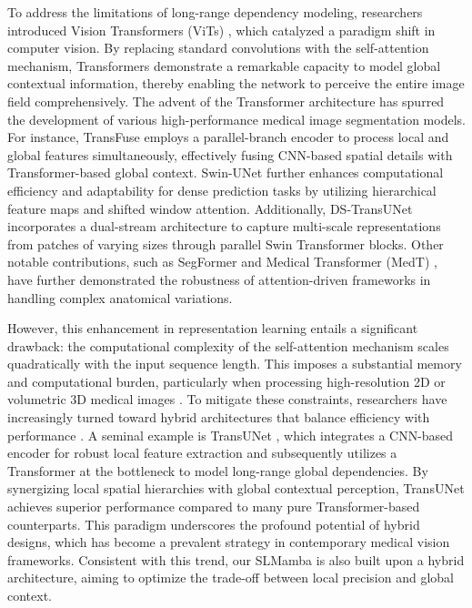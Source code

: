\documentclass[10pt, a4paper, twocolumn]{article}
\begin{document}
To address the limitations of long-range dependency modeling, researchers introduced Vision Transformers (ViTs) \cite{dosovitskiy2020vit}, which catalyzed a paradigm shift in computer vision. By replacing standard convolutions with the self-attention mechanism, Transformers demonstrate a remarkable capacity to model global contextual information, thereby enabling the network to perceive the entire image field comprehensively. The advent of the Transformer architecture has spurred the development of various high-performance medical image segmentation models. For instance, TransFuse \cite{zhang2021transfuse} employs a parallel-branch encoder to process local and global features simultaneously, effectively fusing CNN-based spatial details with Transformer-based global context. Swin-UNet \cite{cao2023swin} further enhances computational efficiency and adaptability for dense prediction tasks by utilizing hierarchical feature maps and shifted window attention. Additionally, DS-TransUNet \cite{lin2022ds} incorporates a dual-stream architecture to capture multi-scale representations from patches of varying sizes through parallel Swin Transformer blocks. Other notable contributions, such as SegFormer \cite{xie2021segformer} and Medical Transformer (MedT) \cite{valanarasu2021medical}, have further demonstrated the robustness of attention-driven frameworks in handling complex anatomical variations.

However, this enhancement in representation learning entails a significant drawback: the computational complexity of the self-attention mechanism scales quadratically with the input sequence length. This imposes a substantial memory and computational burden, particularly when processing high-resolution 2D or volumetric 3D medical images \cite{vaswani2017attention, hatamizadeh2022unetr}. To mitigate these constraints, researchers have increasingly turned toward hybrid architectures that balance efficiency with performance \cite{xie2021cotr}. A seminal example is TransUNet \cite{chen2021transunet}, which integrates a CNN-based encoder for robust local feature extraction and subsequently utilizes a Transformer at the bottleneck to model long-range global dependencies. By synergizing local spatial hierarchies with global contextual perception, TransUNet achieves superior performance compared to many pure Transformer-based counterparts. This paradigm underscores the profound potential of hybrid designs, which has become a prevalent strategy in contemporary medical vision frameworks. Consistent with this trend, our SLMamba is also built upon a hybrid architecture, aiming to optimize the trade-off between local precision and global context.
\end{document}
